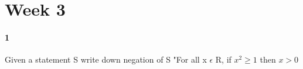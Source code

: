 
\section{Week 3}
\paragraph{1}Given a statement S write down negation of S
"For all x $\epsilon$ R, if $x^2 \geq 1$ then $x \gt 0$


